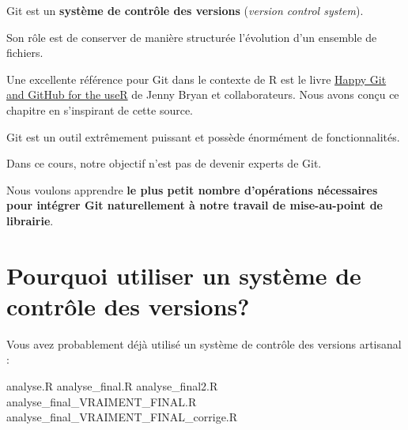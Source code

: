 \documentclass[
  letterpaper,
  DIV=11,
  numbers=noendperiod]{scrreprt}
\newenvironment{Shaded}{\begin{snugshade}}{\end{snugshade}}
\newcommand{\NormalTok}[1]{\textcolor[rgb]{0.00,0.23,0.31}{#1}}
\begin{document}
Git est un \textbf{système de contrôle des versions} (\emph{version
control system}).

Son rôle est de conserver de manière structurée l'évolution d'un
ensemble de fichiers.

Une excellente référence pour Git dans le contexte de R est le livre
\href{https://happygitwithr.com/}{Happy Git and GitHub for the useR} de
Jenny Bryan et collaborateurs. Nous avons conçu ce chapitre en
s'inspirant de cette source.

\begin{tcolorbox}[enhanced jigsaw, arc=.35mm, title=\textcolor{quarto-callout-note-color}{\faInfo}\hspace{0.5em}{Une approche volontairement minimale}, colback=white, left=2mm, rightrule=.15mm, toptitle=1mm, opacityback=0, bottomtitle=1mm, breakable, colframe=quarto-callout-note-color-frame, coltitle=black, toprule=.15mm, titlerule=0mm, opacitybacktitle=0.6, bottomrule=.15mm, colbacktitle=quarto-callout-note-color!10!white, leftrule=.75mm]

Git est un outil extrêmement puissant et possède énormément de
fonctionnalités.

Dans ce cours, notre objectif n'est pas de devenir experts de Git.

Nous voulons apprendre \textbf{le plus petit nombre d'opérations
nécessaires pour intégrer Git naturellement à notre travail de
mise-au-point de librairie}.

\end{tcolorbox}

\section*{Pourquoi utiliser un système de contrôle des
versions?}\label{pourquoi-utiliser-un-systuxe8me-de-contruxf4le-des-versions}


Vous avez probablement déjà utilisé un système de contrôle des versions
artisanal :

\begin{Shaded}
\begin{Highlighting}[]
\NormalTok{analyse.R}
\NormalTok{analyse\_final.R}
\NormalTok{analyse\_final2.R}
\NormalTok{analyse\_final\_VRAIMENT\_FINAL.R}
\NormalTok{analyse\_final\_VRAIMENT\_FINAL\_corrige.R}
\end{Highlighting}
\end{Shaded}
\end{document}
